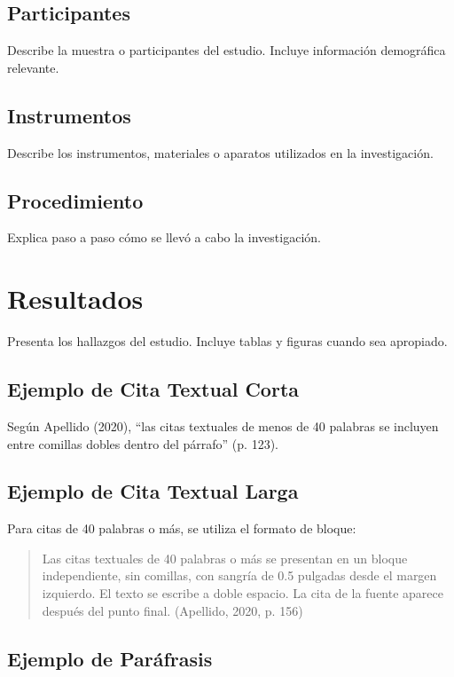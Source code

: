 \documentclass[12pt, letterpaper]{article}
\begin{document}
\subsection{Participantes}

Describe la muestra o participantes del estudio. Incluye información demográfica relevante.

\subsection{Instrumentos}

Describe los instrumentos, materiales o aparatos utilizados en la investigación.

\subsection{Procedimiento}

Explica paso a paso cómo se llevó a cabo la investigación.

\section{Resultados}

Presenta los hallazgos del estudio. Incluye tablas y figuras cuando sea apropiado.

\subsection{Ejemplo de Cita Textual Corta}

Según Apellido (2020), ``las citas textuales de menos de 40 palabras se incluyen entre comillas dobles dentro del párrafo'' (p. 123).

\subsection{Ejemplo de Cita Textual Larga}

Para citas de 40 palabras o más, se utiliza el formato de bloque:

\begin{quote}
    Las citas textuales de 40 palabras o más se presentan en un bloque independiente, sin comillas, con sangría de 0.5 pulgadas desde el margen izquierdo. El texto se escribe a doble espacio. La cita de la fuente aparece después del punto final. (Apellido, 2020, p. 156)
\end{quote}

\subsection{Ejemplo de Paráfrasis}
\end{document}
